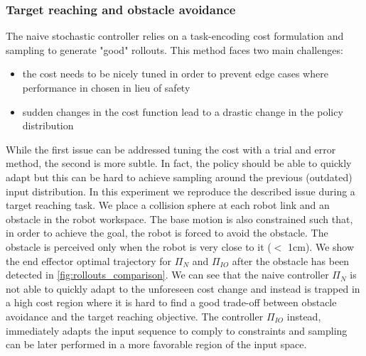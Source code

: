 \vspace{0.5cm}
\subsubsection{Target reaching and obstacle avoidance}
The naive stochastic controller relies on a task-encoding cost formulation and sampling to generate "good" rollouts. This method faces two main challenges:
\begin{itemize}
    \item the cost needs to be nicely tuned in order to prevent edge cases where performance in chosen in lieu of safety
    \item sudden changes in the cost function lead to a drastic change in the policy distribution 
\end{itemize}
While the first issue can be addressed tuning the cost with a trial and error method, the second is more subtle. In fact, the policy should be able to quickly adapt but this can be hard to achieve sampling around the previous (outdated) input distribution. In this experiment we reproduce the described issue during a target reaching task. We place a collision sphere at each robot link and an obstacle in the robot workspace. The base motion is also constrained such that, in order to achieve the goal, the robot is forced to avoid the obstacle. The obstacle is perceived only when the robot is very close to it ($<$ 1cm). We show the end effector optimal trajectory for $\Pi_{N}$ and $\Pi_{IO}$ after the obstacle has been detected in \fig \ref{fig:rollouts_comparison}. We can see that the naive controller $\Pi_{N}$ is not able to quickly adapt to the unforeseen cost change and instead is trapped in a high cost region where it is hard to find a good trade-off between obstacle avoidance and the target reaching objective. The controller $\Pi_{IO}$ instead, immediately adapts the input sequence to comply to constraints and sampling can be later performed in a more favorable region of the input space.   

